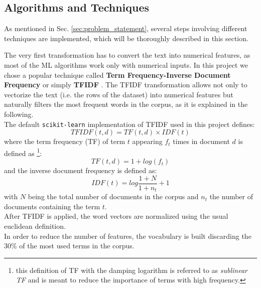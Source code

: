 \documentclass[a4paper,12pt]{article} %
\begin{document}
\newpage
\subsection{Algorithms and Techniques}
\label{sec:algos}
As mentioned in Sec. \ref{sec:problem_statement}, several steps involving
different techniques are implemented, which will be thoroughly described in this section.

The very first transformation has to convert the text into numerical features,
as most of the ML algorithms work only with numerical inputs.
In this project we chose a popular technique called \textbf{Term Frequency-Inverse Document Frequency}
or simply \textbf{TFIDF} \cite{TFIDF}.
The TFIDF transformation allows not only to vectorize the text (i.e. the rows of the dataset)
into numerical features but naturally filters the most frequent words in the corpus,
as it is explained in the following. \\
The default \texttt{scikit-learn} implementation of TFIDF used in this project defines:
\begin{equation}
TFIDF (t, d) = TF(t, d) \times IDF (t)
\end{equation}
where the term frequency (TF) of term $t$ appearing $f_{t}$ times in document $d$ is defined as
\footnote{this definition of TF with the damping logarithm is referred to as \textit{sublinear TF} and
is meant to reduce the importance of terms with high frequency.}:
\begin{equation}
TF (t, d) = 1 + log(f_{t})
\end{equation}
and the inverse document frequency is defined as:
\begin{equation}
IDF (t) = log \frac{1+N}{1+n_{t}} + 1
\end{equation}
with $N$ being the total number of documents in the corpus and $n_{t}$ the number
of documents containing the term $t$.\\
After TFIDF is applied, the word vectors are normalized using the usual euclidean definition. \\
In order to reduce the number of features, the vocabulary is built discarding the
30\% of the most used terms in the corpus.
\end{document}
